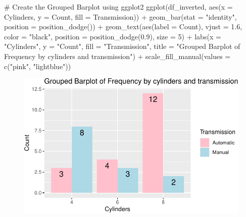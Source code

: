\documentclass[
  letterpaper,
  DIV=11,
  numbers=noendperiod]{scrreport}
\newenvironment{Shaded}{\begin{snugshade}}{\end{snugshade}}
\newcommand{\AttributeTok}[1]{\textcolor[rgb]{0.40,0.45,0.13}{#1}}
\newcommand{\CommentTok}[1]{\textcolor[rgb]{0.37,0.37,0.37}{#1}}
\newcommand{\DecValTok}[1]{\textcolor[rgb]{0.68,0.00,0.00}{#1}}
\newcommand{\FloatTok}[1]{\textcolor[rgb]{0.68,0.00,0.00}{#1}}
\newcommand{\FunctionTok}[1]{\textcolor[rgb]{0.28,0.35,0.67}{#1}}
\newcommand{\NormalTok}[1]{\textcolor[rgb]{0.00,0.23,0.31}{#1}}
\newcommand{\SpecialCharTok}[1]{\textcolor[rgb]{0.37,0.37,0.37}{#1}}
\newcommand{\StringTok}[1]{\textcolor[rgb]{0.13,0.47,0.30}{#1}}
\begin{document}
\begin{Shaded}
\begin{Highlighting}[]
\CommentTok{\# Create the Grouped Barplot using ggplot2}
\FunctionTok{ggplot}\NormalTok{(df\_inverted, }
       \FunctionTok{aes}\NormalTok{(}\AttributeTok{x =}\NormalTok{ Cylinders, }\AttributeTok{y =}\NormalTok{ Count, }\AttributeTok{fill =}\NormalTok{ Transmission)) }\SpecialCharTok{+} 
  \FunctionTok{geom\_bar}\NormalTok{(}\AttributeTok{stat =} \StringTok{"identity"}\NormalTok{, }
           \AttributeTok{position =} \FunctionTok{position\_dodge}\NormalTok{()) }\SpecialCharTok{+}
  \FunctionTok{geom\_text}\NormalTok{(}\FunctionTok{aes}\NormalTok{(}\AttributeTok{label =}\NormalTok{ Count), }
            \AttributeTok{vjust =} \FloatTok{1.6}\NormalTok{, }
            \AttributeTok{color =} \StringTok{"black"}\NormalTok{, }
            \AttributeTok{position =} \FunctionTok{position\_dodge}\NormalTok{(}\FloatTok{0.9}\NormalTok{), }
            \AttributeTok{size =} \DecValTok{5}\NormalTok{) }\SpecialCharTok{+}
  \FunctionTok{labs}\NormalTok{(}\AttributeTok{x =} \StringTok{"Cylinders"}\NormalTok{, }\AttributeTok{y =} \StringTok{"Count"}\NormalTok{, }\AttributeTok{fill =} \StringTok{"Transmission"}\NormalTok{,}
       \AttributeTok{title =} \StringTok{"Grouped Barplot of Frequency by cylinders and transmission"}\NormalTok{) }\SpecialCharTok{+}
  \FunctionTok{scale\_fill\_manual}\NormalTok{(}\AttributeTok{values =} \FunctionTok{c}\NormalTok{(}\StringTok{"pink"}\NormalTok{, }\StringTok{"lightblue"}\NormalTok{))}
\end{Highlighting}
\end{Shaded}

\begin{figure}[H]

{\centering \includegraphics{08CategoricalData02_files/figure-pdf/unnamed-chunk-23-1.pdf}

}

\end{figure}
\end{document}
